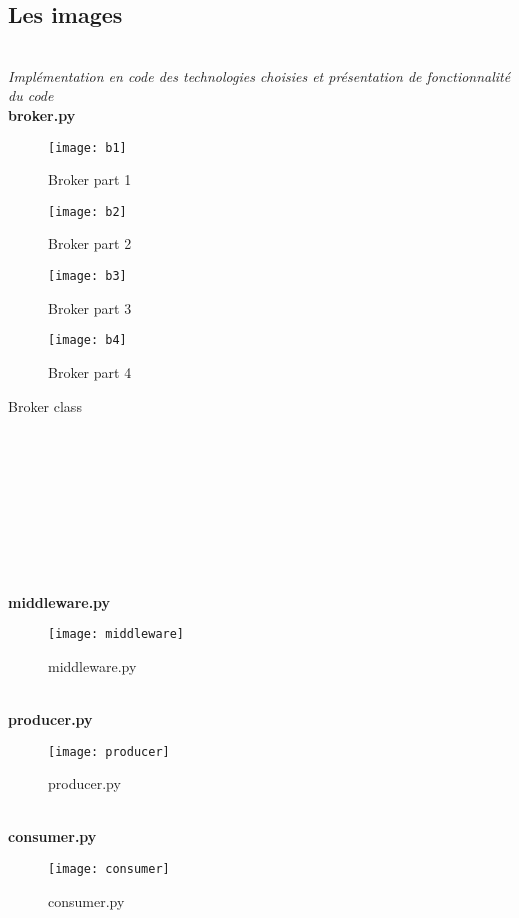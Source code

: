 \subsection{Les images}

\emph{\\Implémentation en code des technologies choisies et présentation de fonctionnalité du code}\\

\textbf{broker.py}
\begin{figure}[!ht]
	\centering
	\texttt{[image: b1]}
	\caption{Broker part 1}\label{b1}
	\vspace{1cm}
	\centering
	\texttt{[image: b2]}
	\caption{Broker part 2}\label{b2}
\end{figure}

\begin{figure}[!ht]
	\centering
	\texttt{[image: b3]}
	\caption{Broker part 3}\label{b3}
	\vspace{1cm}
	\centering
	\texttt{[image: b4]}
	\caption{Broker part 4}\label{b4}
\end{figure}

Broker class \\\\\\\\\\\\\\\\\\

\textbf{\\middleware.py}\\
\begin{figure}[!ht]
	\centering
	\texttt{[image: middleware]}
	\caption{middleware.py}\label{middleware}
\end{figure}


\textbf{\\producer.py}\\
\begin{figure}[!ht]
	\centering
	\texttt{[image: producer]}
	\caption{producer.py}\label{producer}
\end{figure}


\textbf{\\consumer.py}\\
\begin{figure}[!ht]
	\centering
	\texttt{[image: consumer]}
	\caption{consumer.py}\label{consumer}
\end{figure}

\clearpage